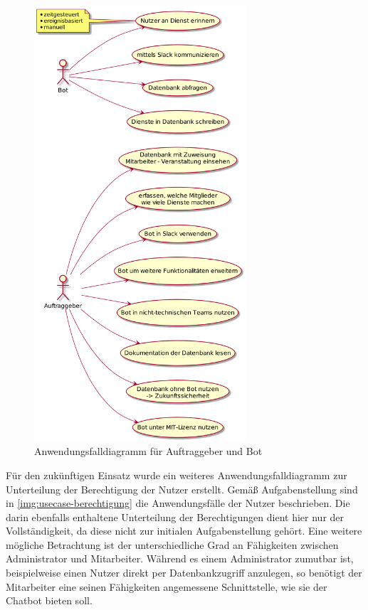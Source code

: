 \begin{figure}[htbp]
    \includegraphics[width=0.7\textwidth]{../docs/uml/usecase-stakeholder.png}
    \caption{Anwendungsfalldiagramm für Auftraggeber und Bot}
    \label{usecase-auftrag}
\end{figure}


Für den zukünftigen Einsatz wurde ein weiteres Anwendungsfalldiagramm zur Unterteilung der Berechtigung der Nutzer erstellt. Gemäß Aufgabenstellung sind in \autoref{img:usecase-berechtigung} die Anwendungsfälle der Nutzer beschrieben. Die darin ebenfalls enthaltene Unterteilung der Berechtigungen dient hier nur der Vollständigkeit, da diese nicht zur initialen Aufgabenstellung gehört.
Eine weitere mögliche Betrachtung ist der unterschiedliche Grad an Fähigkeiten zwischen Administrator und Mitarbeiter. Während es einem Administrator zumutbar ist, beispielweise einen Nutzer direkt per Datenbankzugriff anzulegen, so benötigt der Mitarbeiter eine seinen Fähigkeiten angemessene Schnittstelle, wie sie der Chatbot bieten soll.

